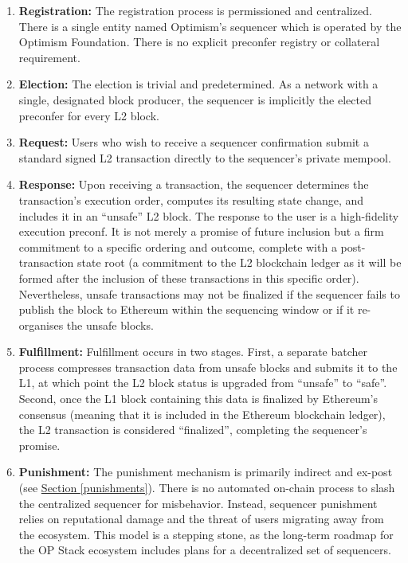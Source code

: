 \documentclass[a4paper]{article}
\theoremstyle{boldstyle}
\begin{document}
        \begin{enumerate}
            \item \textbf{Registration:}
            The registration process is permissioned and centralized. There is a single entity named Optimism's sequencer which is operated by the Optimism Foundation. There is no explicit preconfer registry or collateral requirement. 
            
            \item \textbf{Election:}             
            The election is trivial and predetermined. As a network with a single, designated block producer, the sequencer is implicitly the elected preconfer for every L2 block.
            
            \item \textbf{Request:}
            Users who wish to receive a sequencer confirmation submit a standard signed L2 transaction directly to the sequencer's private mempool.
            
            \item \textbf{Response:}
            Upon receiving a transaction, the sequencer determines the transaction's execution order, computes its resulting state change, and includes it in an ``unsafe'' L2 block. 
            The response to the user is a high-fidelity execution preconf. It is not merely a promise of future inclusion but a firm commitment to a specific ordering and outcome, complete with a post-transaction state root (a commitment to the L2 blockchain ledger as it will be formed after the inclusion of these transactions in this specific order). Nevertheless, unsafe transactions may not be finalized if the sequencer fails to publish the block to Ethereum within the sequencing window or if it re-organises the unsafe blocks.
            
            \item \textbf{Fulfillment:}
            Fulfillment occurs in two stages. First, a separate batcher process compresses transaction data from unsafe blocks and submits it to the L1, at which point the L2 block status is upgraded from ``unsafe'' to ``safe''. Second, once the L1 block containing this data is finalized by Ethereum's consensus (meaning that it is included in the Ethereum blockchain ledger), the L2 transaction is considered ``finalized'', completing the sequencer's promise.
            
            \item \textbf{Punishment:} 
            The punishment mechanism is primarily indirect and ex-post (see \hyperref[punishments]{Section \ref{punishments}}). There is no automated on-chain process to slash the centralized sequencer for misbehavior. Instead, sequencer punishment relies on reputational damage and the threat of users migrating away from the ecosystem. This model is a stepping stone, as the long-term roadmap for the OP Stack ecosystem includes plans for a decentralized set of sequencers.
        
        \end{enumerate}
\end{document}
